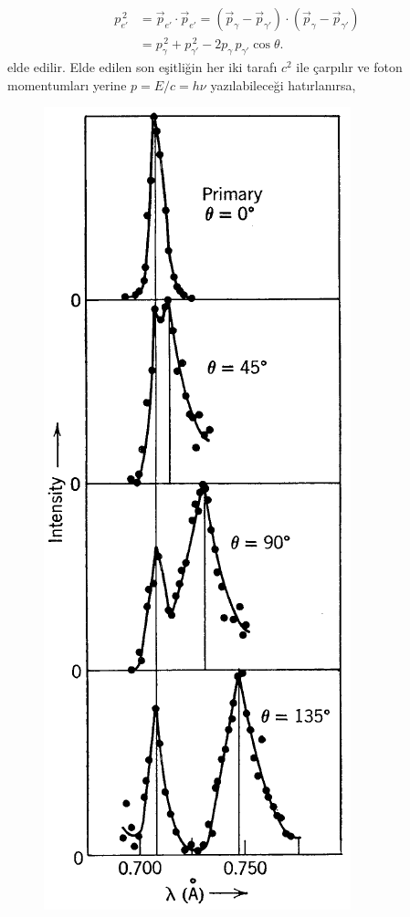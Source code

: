 \documentclass[a4paper,12pt, twoside]{article}
\begin{document}
\begin{align}
\label{eq:compton_E_conv6}
p_{e'}^{\, 2} &= \vec{p}_{e'}\cdot\vec{p}_{e'} = (\vec{p}_\gamma - \vec{p}_{\gamma'}) \cdot (\vec{p}_\gamma - \vec{p}_{\gamma'}) \\
&= p_{\gamma}^{\, 2} + p_{\gamma'}^{\, 2} - 2 p_{\gamma}\, p_{\gamma'} \cos\theta. 
\end{align}
elde edilir. Elde edilen son eşitliğin her iki tarafı $c^2$ ile çarpılır ve foton momentumları yerine $p = E/c = h\nu$ yazılabileceği hatırlanırsa,
\begin{figure}[hbtp]
\begin{minipage}{0.45\textwidth}
{\center
\includegraphics[scale=.8]{compton_exp_data.png}
}
\end{minipage}
\end{figure}
\end{document}
